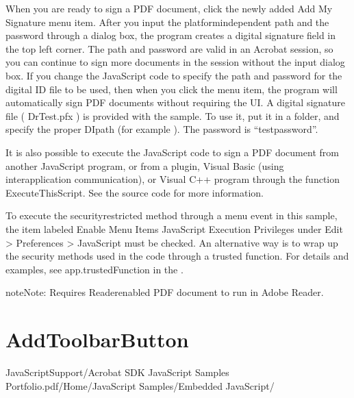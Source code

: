 \documentclass[letterpaper,12pt,english,openany,oneside]{sphinxmanual}
\begin{document}
When you are ready to sign a PDF document, click the newly added Add My Signature menu item. After you input the platform\sphinxhyphen{}independent path and the password through a dialog box, the program creates a digital signature field in the top left corner. The path and password are valid in an Acrobat session, so you can continue to sign more documents in the session without the input dialog box. If you change the JavaScript code to specify the path and password for the digital ID file to be used, then when you click the menu item, the program will automatically sign PDF documents without requiring the UI. A digital signature file ( DrTest.pfx ) is provided with the sample. To use it, put it in a folder, and specify the proper DIpath (for example  ). The password is “testpassword”.

It is also possible to execute the JavaScript code to sign a PDF document from another JavaScript program, or from a plugin, Visual Basic (using interapplication communication), or Visual C++ program through the function ExecuteThisScript. See the source code for more information.

To execute the security\sphinxhyphen{}restricted method through a menu event in this sample, the item labeled Enable Menu Items JavaScript Execution Privileges under Edit > Preferences > JavaScript must be checked. An alternative way is to wrap up the security methods used in the code through a trusted function. For details and examples, see app.trustedFunction in the  .

\begin{sphinxadmonition}{note}{Note:}
Requires Reader\sphinxhyphen{}enabled PDF document to run in Adobe Reader.
\end{sphinxadmonition}


\section{AddToolbarButton}
\label{\detokenize{Samples_JavaScript:addtoolbarbutton}}\label{\detokenize{Samples_JavaScript:location-2}}

JavaScriptSupport/Acrobat SDK JavaScript Samples Portfolio.pdf/Home/JavaScript Samples/Embedded JavaScript/

\label{\detokenize{Samples_JavaScript:description-2}}
\end{document}
